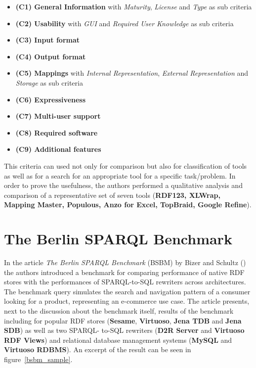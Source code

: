 \begin{itemize}
\item \textbf{(C1) General Information} with \textit{Maturity}, \textit{License} and \textit{Type} as sub criteria
\item \textbf{(C2) Usability} with \textit{GUI} and \textit{Required User Knowledge} as sub criteria
\item \textbf{(C3) Input format}
\item \textbf{(C4) Output format}
\item \textbf{(C5) Mappings} with \textit{Internal Representation}, \textit{External Representation} and \textit{Storage} as sub criteria
\item \textbf{(C6) Expressiveness}
\item \textbf{(C7) Multi-user support}
\item \textbf{(C8) Required software}
\item \textbf{(C9) Additional features}
\end{itemize}

This criteria can used not only for comparison but also for classification of 
tools as well as for a search for an appropriate tool for a specific task/problem. 
In order to prove the usefulness, the authors performed a qualitative analysis and 
comparison of a representative set of seven tools (\textbf{RDF123, XLWrap, Mapping 
Master, Populous, Anzo for Excel, TopBraid, Google Refine}). 

\section{The Berlin SPARQL Benchmark}

In the article \textit{The Berlin SPARQL Benchmark} (BSBM) by Bizer and Schultz 
(\cite{bizer2009berlin}) the authors introduced a benchmark for comparing 
performance of native RDF stores with the performances of SPARQL-to-SQL rewriters 
across architectures. The benchmark query simulates the search and navigation 
pattern of a consumer looking for a product, representing an e-commerce use case. 
The article presents, next to the discussion about the benchmark itself, results 
of the benchmark including for popular RDF stores (\textbf{Sesame}, 
\textbf{Virtuoso}, \textbf{Jena TDB} and \textbf{Jena SDB}) as well as two SPARQL-
to-SQL rewriters (\textbf{D2R Server} and \textbf{Virtuoso RDF Views}) and 
relational database management systems (\textbf{MySQL} and \textbf{Virtuoso 
RDBMS}). An excerpt of the result can be seen in figure~\ref{bsbm_sample}.

